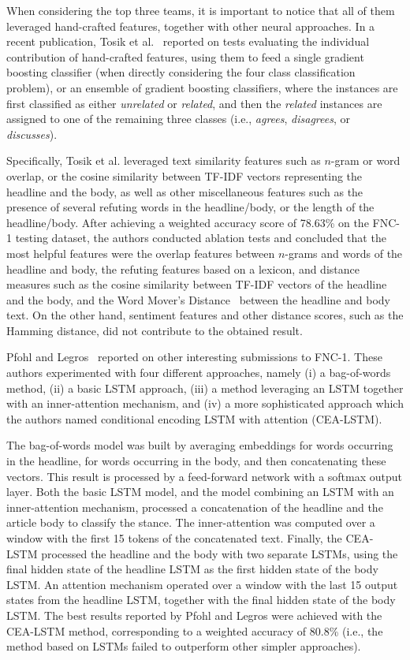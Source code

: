 When considering the top three teams, it is important to notice that all of them leveraged hand-crafted features, together with other neural approaches. In a recent publication, Tosik et al.~\cite{tosikdebunking} reported on tests evaluating the individual contribution of hand-crafted features, using them to feed a single gradient boosting classifier (when directly considering the four class classification problem), or an ensemble of gradient boosting classifiers, where the instances are first classified as either \textit{unrelated} or \textit{related}, and then the \textit{related} instances are assigned to one of the remaining three classes (i.e., \textit{agrees}, \textit{disagrees}, or \textit{discusses}).

Specifically, Tosik et al. leveraged text similarity features such as $n$-gram or word overlap, or the cosine similarity between TF-IDF vectors representing the headline and the body, as well as other miscellaneous features such as the presence of several refuting words in the headline/body, or the length of the headline/body. After achieving a weighted accuracy score of 78.63\% on the FNC-1 testing dataset, the authors conducted ablation tests and concluded that the most helpful features were the overlap features between $n$-grams and words of the headline and body, the refuting features based on a lexicon, and distance measures such as the cosine similarity between TF-IDF vectors of the headline and the body, and the Word Mover's Distance~\cite{wmd} between the headline and body text. On the other hand, sentiment features and other distance scores, such as the Hamming distance, did not contribute to the obtained result.

Pfohl and Legros~\cite{stanfordattention} reported on other interesting submissions to FNC-1. These authors experimented with four different approaches, namely (i) a bag-of-words method, (ii) a basic LSTM approach, (iii) a method leveraging an LSTM together with an inner-attention mechanism, and (iv) a more sophisticated approach which the authors named conditional encoding LSTM with attention (CEA-LSTM).  

The bag-of-words model was built by averaging embeddings for words occurring in the headline, for words occurring in the body, and then concatenating these vectors. This result is processed by a feed-forward network with a softmax output layer. Both the basic LSTM model, and the model combining an LSTM with an inner-attention mechanism, processed a concatenation of the headline and the article body to classify the stance. The inner-attention was computed over a window with the first 15 tokens of the concatenated text. Finally, the CEA-LSTM processed the headline and the body with two separate LSTMs, using the final hidden state of the headline LSTM as the first hidden state of the body LSTM. An attention mechanism operated over a  window with the last 15 output states from the headline LSTM, together with the final hidden state of the body LSTM. 
The best results reported by Pfohl and Legros were achieved with the CEA-LSTM method, corresponding to a weighted accuracy of 80.8\% (i.e., the method based on LSTMs failed to outperform other simpler approaches).

